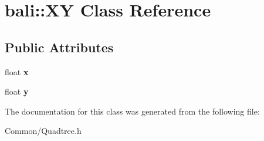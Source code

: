 \hypertarget{classbali_1_1_x_y}{\section{bali\-:\-:X\-Y Class Reference}
\label{classbali_1_1_x_y}
}
\subsection*{Public Attributes}
\begin{DoxyCompactItemize}
\item 
\hypertarget{classbali_1_1_x_y_a5b69afd16411f8c5e2b36156e24feb90}{float {\bfseries x}}\label{classbali_1_1_x_y_a5b69afd16411f8c5e2b36156e24feb90}

\item 
\hypertarget{classbali_1_1_x_y_a4adca0ea4558ae543e12e43ee305c18e}{float {\bfseries y}}\label{classbali_1_1_x_y_a4adca0ea4558ae543e12e43ee305c18e}

\end{DoxyCompactItemize}


The documentation for this class was generated from the following file\-:\begin{DoxyCompactItemize}
\item 
Common/Quadtree.\-h\end{DoxyCompactItemize}
